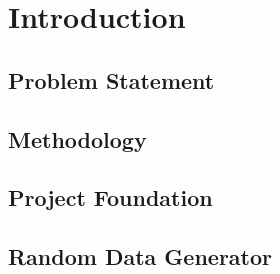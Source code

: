 \chapter{Introduction}\label{ch:introduction}

\section{Problem Statement}

\section{Methodology}

\section{Project Foundation}

\section{Random Data Generator}
